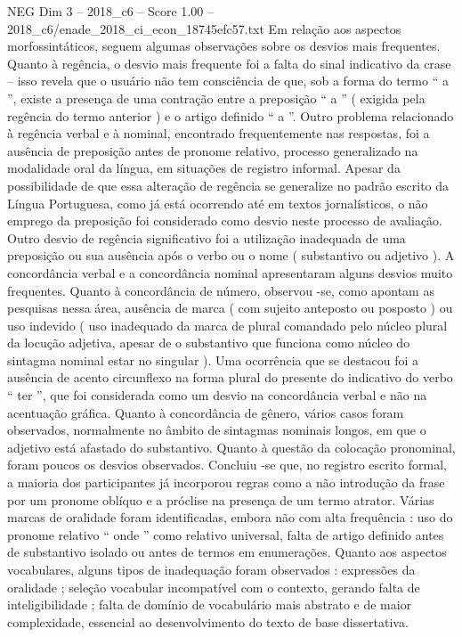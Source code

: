 \begin{textsample}{NEG Dim 3 – 2018\_c6 – Score 1.00 – 2018\_c6/enade\_2018\_ci\_econ\_18745efc57.txt}
Em relação aos aspectos morfossintáticos, seguem algumas observações sobre os desvios mais frequentes.
Quanto à regência, o desvio mais frequente foi a falta do sinal indicativo da crase – isso revela que o usuário não tem consciência de que, sob a forma do termo “ a ”, existe a presença de uma contração entre a preposição “ a ” ( exigida pela regência do termo anterior ) e o artigo definido “ a ”.
Outro problema relacionado à regência verbal e à nominal, encontrado frequentemente nas respostas, foi a ausência de preposição antes de pronome relativo, processo generalizado na modalidade oral da língua, em situações de registro informal.
Apesar da possibilidade de que essa alteração de regência se generalize no padrão escrito da Língua Portuguesa, como já está ocorrendo até em textos jornalísticos, o não emprego da preposição foi considerado como desvio neste processo de avaliação.
Outro desvio de regência significativo foi a utilização inadequada de uma preposição ou sua ausência após o verbo ou o nome ( substantivo ou adjetivo ).
A concordância verbal e a concordância nominal apresentaram alguns desvios muito frequentes.
Quanto à concordância de número, observou -se, como apontam as pesquisas nessa área, ausência de marca ( com sujeito anteposto ou posposto ) ou uso indevido ( uso inadequado da marca de plural comandado pelo núcleo plural da locução adjetiva, apesar de o substantivo que funciona como núcleo do sintagma nominal estar no singular ).
Uma ocorrência que se destacou foi a ausência de acento circunflexo na forma plural do presente do indicativo do verbo “ ter ”, que foi considerada como um desvio na concordância verbal e não na acentuação gráfica.
Quanto à concordância de gênero, vários casos foram observados, normalmente no âmbito de sintagmas nominais longos, em que o adjetivo está afastado do substantivo.
Quanto à questão da colocação pronominal, foram poucos os desvios observados.
Concluiu -se que, no registro escrito formal, a maioria dos participantes já incorporou regras como a não introdução da frase por um pronome oblíquo e a próclise na presença de um termo atrator.
Várias marcas de oralidade foram identificadas, embora não com alta frequência : uso do pronome relativo “ onde ” como relativo universal, falta de artigo definido antes de substantivo isolado ou antes de termos em enumerações.
Quanto aos aspectos vocabulares, alguns tipos de inadequação foram observados : expressões da oralidade ; seleção vocabular incompatível com o contexto, gerando falta de inteligibilidade ; falta de domínio de vocabulário mais abstrato e de maior complexidade, essencial ao desenvolvimento do texto de base dissertativa.

\end{textsample}
